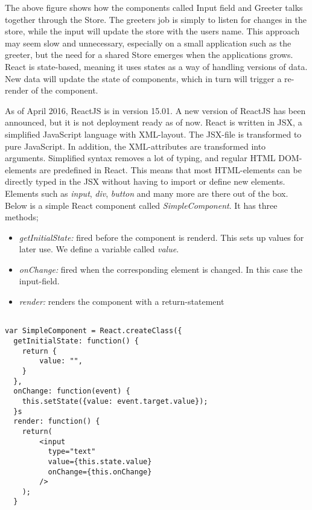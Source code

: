 {

The above figure shows how the components called Input field and Greeter talks together through the Store. The greeters job is simply to listen for changes in the store, while the input will update the store with the users name. This approach may seem slow and unnecessary, especially on a small application such as the greeter, but the need for a shared Store emerges when the applications grows. React is state-based, meaning it uses states as a way of handling versions of data. New data will update the state of components, which in turn will trigger a re-render of the component. 

As of April 2016, ReactJS is in version 15.01. A new version of ReactJS has been announced, but it is not deployment ready as of now. React is written in JSX, a simplified JavaScript language with XML-layout. The JSX-file is transformed to pure JavaScript. In addition, the XML-attributes are transformed into arguments. Simplified syntax removes a lot of typing, and regular HTML DOM-elements are predefined in React. This means that most HTML-elements can be directly typed in the JSX without having to import or define new elements. Elements such as \emph{input}, \emph{div}, \emph{button} and many more are there out of the box. Below is a simple React component called \emph{SimpleComponent}. It has three methods;


\begin{itemize}
\item \emph{getInitialState:} fired before the component is renderd. This sets up
values for later use. We define a variable called \emph{value}. 
\item \emph{onChange:} fired when the corresponding element is changed. In this case the input-field.
\item \emph{render:} renders the component with a return-statement
\end{itemize}








\begin{lstlisting}[caption=Simple React element with onClick-handlers, label=lst:simplecomponent]

var SimpleComponent = React.createClass({
  getInitialState: function() {
    return {
		value: "",
    }
  },
  onChange: function(event) {
  	this.setState({value: event.target.value});
  }s
  render: function() {
	return(
		<input 
		  type="text"
		  value={this.state.value}
		  onChange={this.onChange}
		/>	
	);  
  }  
\end{lstlisting}

}
